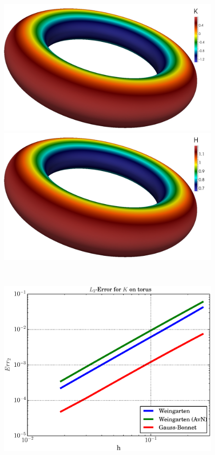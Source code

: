   \begin{figure}
    \begin{minipage}[htp]{.23\textwidth}
      \centering
      \includegraphics[width=0.99\textwidth]{bilder/torus/K.jpg}
    \end{minipage}\hfill
    \begin{minipage}[htp]{.23\textwidth}
      \centering
      \includegraphics[width=0.99\textwidth]{bilder/torus/H.jpg}
    \end{minipage}\\
    \begin{minipage}[htp]{.23\textwidth}
      \centering
      \includegraphics[width=0.99\textwidth]{bilder/torus/L2K.eps}

\end{minipage}
\end{figure}
